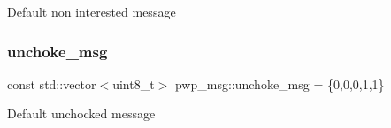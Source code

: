 Default non interested message \mbox{\label{namespacepwp__msg_acdc5eb698534e84a15db0e061c511e7c}} 
\subsubsection{\texorpdfstring{unchoke\+\_\+msg}{unchoke\_msg}}
{\footnotesize\ttfamily const std\+::vector$<$uint8\+\_\+t$>$ pwp\+\_\+msg\+::unchoke\+\_\+msg = \{0,0,0,1,1\}}

Default unchocked message 